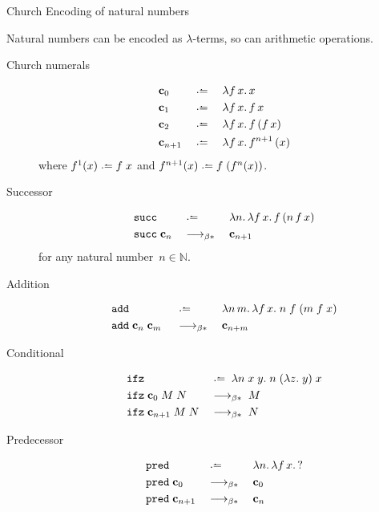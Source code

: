 \begin{frame}[allowframebreaks]{Church Encoding of natural numbers}

  Natural numbers can be encoded as $\lambda$-terms, so can arithmetic operations. 
  \begin{description}
    \item[Church numerals] 
      \begin{align*}
        &\bc_0 &&\defeq\;&& \lambda f\,x.\, x \\
        &\bc_{1} &&\defeq\;&& \lambda f\,x.\, f\,x \\
        &\bc_{2} &&\defeq\;&& \lambda f\,x.\, f\,(f\,x) \\
        &\bc_{n+1} &&\defeq\;&& \lambda f\,x.\, f^{n+1}\,(x)
      \end{align*}
      where $f^1(x) \defeq f\;x$ and $f^{n+1}(x)  \defeq f\;(f^n(x))$.
    \item[Successor]
      \begin{align*}
        & \mathtt{succ} && \defeq\; && \lambda n.\,\lambda f\,x.\, f\,(n\,f\,x) \\
        & \mathtt{succ}\;\bc_n && \reduce\; && \bc_{n+1}
      \end{align*}
      for any natural number~$n \in \mathbb{N}$.
    \item[Addition]
      \begin{align*}
        & \mathtt{add} && \defeq\; && \lambda n\,m.\,\lambda f\,x.\;
        n\;f\;(m\;f\;x)  \\ & \mathtt{add}\;\bc_{n}\;\bc_{m}\;
                            && \reduce\; && \bc_{n + m}
      \end{align*}
  \end{description}


  \begin{description}
    \item[Conditional]
      \begin{align*}
        & \mathtt{ifz} && \defeq \; \lambda n\;x\;y.\;n\;(\lambda z.\;y)\;x 
        \\
        & \mathtt{ifz}\;\bc_0\;M\;N && \reduce \; M \\
        & \mathtt{ifz}\;\bc_{n+1}\;M\;N && \reduce \; N
      \end{align*}
    \item[Predecessor]
      \begin{align*}
        & \mathtt{pred} && \defeq\; && \lambda n.\, \lambda f\,x.\, ? \\
        & \mathtt{pred}\;\bc_{0}  && \reduce\; && \bc_{0} \\
        & \mathtt{pred}  \;\bc_{n+1} && \reduce\; && \bc_{n}
      \end{align*}
  \end{description}
\end{frame}

